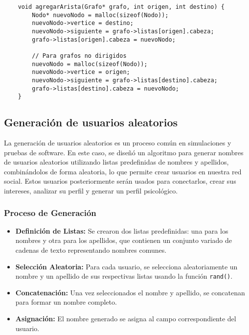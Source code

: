 \documentclass[9pt,letterpaper,onecolumn]{rho-class/rho}
\begin{document}
    \begin{verbatim}
    void agregarArista(Grafo* grafo, int origen, int destino) {
        Nodo* nuevoNodo = malloc(sizeof(Nodo));
        nuevoNodo->vertice = destino;
        nuevoNodo->siguiente = grafo->listas[origen].cabeza;
        grafo->listas[origen].cabeza = nuevoNodo;

        // Para grafos no dirigidos
        nuevoNodo = malloc(sizeof(Nodo));
        nuevoNodo->vertice = origen;
        nuevoNodo->siguiente = grafo->listas[destino].cabeza;
        grafo->listas[destino].cabeza = nuevoNodo;
    }
    \end{verbatim}

    \subsection{Generación de usuarios aleatorios}
    La generación de usuarios aleatorios es un proceso común en simulaciones y pruebas de software. 
    En este caso, se diseñó un algoritmo para generar nombres de usuarios aleatorios utilizando listas predefinidas de nombres y apellidos, combinándolos de forma aleatoria, lo que permite crear usuarios en nuestra red social.
    Estos usuarios posteriormente serán usados para conectarlos, crear sus intereses, analizar su perfil y generar un perfil psicológico.

    \subsubsection{Proceso de Generación}
    \begin{itemize}
        \item \textbf{Definición de Listas:} Se crearon dos listas predefinidas: una para los nombres y otra para los apellidos, que contienen un conjunto variado de cadenas de texto representando nombres comunes.
        \item \textbf{Selección Aleatoria:} Para cada usuario, se selecciona aleatoriamente un nombre y un apellido de sus respectivas listas usando la función \texttt{rand()}.
        \item \textbf{Concatenación:} Una vez seleccionados el nombre y apellido, se concatenan para formar un nombre completo.
        \item \textbf{Asignación:} El nombre generado se asigna al campo correspondiente del usuario.
    \end{itemize}
\end{document}
